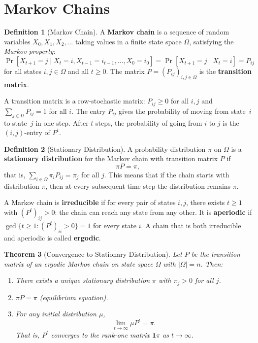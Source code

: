 \documentclass[twoside,12pt]{book}
\theoremstyle{plain}
\newtheorem{theorem}{Theorem}[chapter]
\theoremstyle{definition}
\newtheorem{definition}[theorem]{Definition}
\theoremstyle{remark}
\begin{document}
\section{Markov Chains}
\label{sec:markov-chains}

\begin{definition}[Markov Chain]\label{def:markov-chain}
A \textbf{Markov chain} is a sequence of random variables
$X_0, X_1, X_2, \ldots$ taking values in a finite state space $\Omega$,
satisfying the \emph{Markov property}:
\[
    \Pr[X_{t+1} = j \mid X_t = i, X_{t-1} = i_{t-1}, \ldots, X_0 = i_0]
    = \Pr[X_{t+1} = j \mid X_t = i] = P_{ij}
\]
for all states $i, j \in \Omega$ and all $t \geq 0$. The matrix
$P = (P_{ij})_{i,j \in \Omega}$ is the \textbf{transition matrix}.
\end{definition}

A transition matrix is a row-stochastic matrix: $P_{ij} \geq 0$ for all
$i, j$ and $\sum_{j \in \Omega} P_{ij} = 1$ for all $i$. The entry
$P_{ij}$ gives the probability of moving from state~$i$ to state~$j$ in
one step. After $t$ steps, the probability of going from $i$ to $j$ is
the $(i,j)$-entry of $P^t$.

\begin{definition}[Stationary Distribution]\label{def:stationary}
A probability distribution $\pi$ on $\Omega$ is a \textbf{stationary
distribution} for the Markov chain with transition matrix $P$ if
\[
    \pi P = \pi,
\]
that is, $\sum_{i \in \Omega} \pi_i P_{ij} = \pi_j$ for all $j$. This
means that if the chain starts with distribution $\pi$, then at every
subsequent time step the distribution remains $\pi$.
\end{definition}

A Markov chain is \textbf{irreducible} if for every pair of states
$i, j$, there exists $t \geq 1$ with $(P^t)_{ij} > 0$: the chain can
reach any state from any other. It is \textbf{aperiodic} if
$\gcd\{t \geq 1 : (P^t)_{ii} > 0\} = 1$ for every state $i$. A chain
that is both irreducible and aperiodic is called \textbf{ergodic}.

\begin{theorem}[Convergence to Stationary Distribution]\label{thm:convergence}
Let $P$ be the transition matrix of an ergodic Markov chain on state
space $\Omega$ with $|\Omega| = n$. Then:
\begin{enumerate}[label=(\roman*)]
\item There exists a unique stationary distribution $\pi$ with $\pi_j > 0$
    for all $j$.
\item $\pi P = \pi$ (equilibrium equation).
\item For any initial distribution $\mu$,
    \[
        \lim_{t \to \infty} \mu P^t = \pi.
    \]
    That is, $P^t$ converges to the rank-one matrix $\mathbf{1}\pi$ as
    $t \to \infty$.
\end{enumerate}
\end{theorem}
\end{document}
